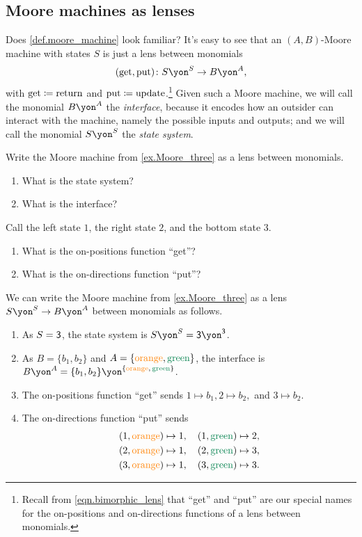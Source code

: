 \documentclass[Book-Poly]{subfiles}
\begin{document}
\subsection{Moore machines as lenses}

Does \cref{def.moore_machine} look familiar?
It's easy to see that an $(A,B)$-Moore machine with states $S$ is just a lens between monomials
\[
(\lensget, \lensput)\colon S\yon^S\to B\yon^A,
\]
with $\mathrm{get}\coloneqq\text{return}$ and $\mathrm{put}\coloneqq\text{update}$.\footnote{Recall from \eqref{eqn.bimorphic_lens} that ``get'' and ``put'' are our special names for the on-positions and on-directions functions of a lens between monomials.}
Given such a Moore machine, we will call the monomial $B\yon^A$ the \emph{interface}, because it encodes how an outsider can interact with the machine, namely the possible inputs and outputs; and we will call the monomial $S\yon^S$ the \emph{state system}.

\begin{exercise}
Write the Moore machine from \cref{ex.Moore_three} as a lens between monomials.
\begin{enumerate}
    \item What is the state system?
    \item What is the interface?
\end{enumerate}
Call the left state $1$, the right state $2$, and the bottom state $3$.
\begin{enumerate}[resume]
    \item What is the on-positions function ``get''?
    \item What is the on-directions function ``put''? \qedhere
\end{enumerate}
\begin{solution}
We can write the Moore machine from \cref{ex.Moore_three} as a lens $S\yon^S\to B\yon^A$ between monomials as follows.
\begin{enumerate}
    \item As $S=\textsf{3}$, the state system is $S\yon^S=\3\yon^\3$.
    \item As $B=\{b_1,b_2\}$ and $A=\{{\color{orange}\text{orange}},{\color{dgreen}\text{green}}\}$, the interface is $B\yon^A=\{b_1,b_2\}\yon^{\{{\color{orange}\text{orange}},\,{\color{dgreen}\text{green}}\}}$.
    \item The on-positions function ``get'' sends $1\mapsto b_1, 2\mapsto b_2,$ and $3\mapsto b_2$.
    \item The on-directions function ``put'' sends
    \begin{align*}
        (1, {\color{orange}\text{orange}})\mapsto1&,\quad(1, {\color{dgreen}\text{green}})\mapsto2, \\
        (2, {\color{orange}\text{orange}})\mapsto1&,\quad(2, {\color{dgreen}\text{green}})\mapsto3, \\
        (3, {\color{orange}\text{orange}})\mapsto1&,\quad(3, {\color{dgreen}\text{green}})\mapsto3.
    \end{align*}
\end{enumerate}
\end{solution}
\end{exercise}
\end{document}
